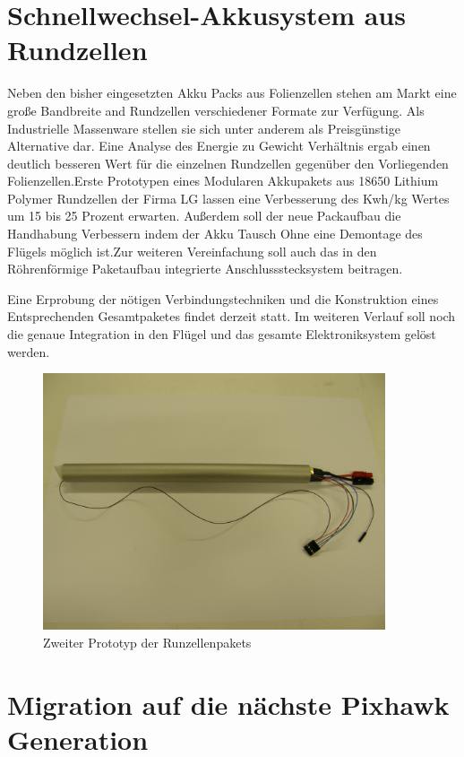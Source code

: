 \section{Schnellwechsel-Akkusystem aus Rundzellen}

Neben den bisher eingesetzten Akku Packs aus Folienzellen stehen am Markt eine große Bandbreite and Rundzellen verschiedener Formate zur Verfügung. Als Industrielle Massenware stellen sie sich unter anderem als Preisgünstige Alternative dar.
Eine Analyse des Energie zu Gewicht Verhältnis ergab einen deutlich besseren Wert für die einzelnen Rundzellen gegenüber den Vorliegenden Folienzellen.Erste Prototypen eines Modularen Akkupakets aus 18650 Lithium Polymer Rundzellen der Firma LG lassen eine Verbesserung des Kwh/kg Wertes um 15 bis 25 Prozent erwarten.
Außerdem soll der neue Packaufbau die Handhabung Verbessern indem der Akku Tausch Ohne eine Demontage des Flügels möglich ist.Zur weiteren Vereinfachung soll auch das in den Röhrenförmige Paketaufbau integrierte Anschlussstecksystem beitragen.

Eine Erprobung der nötigen Verbindungstechniken und die Konstruktion eines Entsprechenden Gesamtpaketes findet derzeit statt.
Im weiteren Verlauf soll noch die genaue Integration in den Flügel und das gesamte Elektroniksystem gelöst werden.

\begin{figure}[H]
\centering
\includegraphics[width=0.9\textwidth]{bilder/Fotos/Prototyp_18650er_Zellensystem.jpg} 
\caption{Zweiter Prototyp der Runzellenpakets} 
\label{fig:Zweiter Prototyp der Runzellenpakets}
\end{figure}

\section{Migration auf die nächste Pixhawk Generation}

